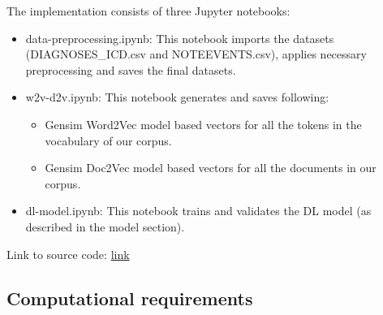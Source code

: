 \documentclass[11pt,a4paper]{article}
\begin{document}
The implementation consists of three Jupyter notebooks:
\begin{itemize}
    \item data-preprocessing.ipynb: This notebook imports the datasets (DIAGNOSES\_ICD.csv and NOTEEVENTS.csv), applies necessary preprocessing and saves the final datasets.
    \item w2v-d2v.ipynb: This notebook generates and saves following:
	\begin{itemize}
		\item Gensim Word2Vec model based vectors for all the tokens in the vocabulary of our corpus.
		\item Gensim Doc2Vec model based vectors for all the documents in our corpus.
	\end{itemize}
	\item dl-model.ipynb: This notebook trains and validates the DL model (as described in the model section).
\end{itemize}

Link to source code: \url{link}


\subsection{Computational requirements}
\end{document}
